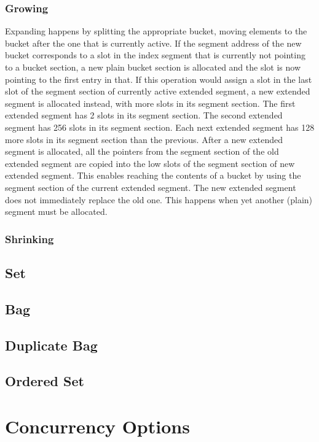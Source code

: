 \documentclass[aps,pre,preprint,nofootinbib]{revtex4}
\begin{document}
\subsubsection{Growing}

Expanding happens by splitting the appropriate bucket, moving elements to the bucket after the one that is currently active.
If the segment address of the new bucket corresponds to a slot in the index segment that is currently not pointing to a bucket section, a new plain bucket section is allocated and the slot is now pointing to the first entry in that.
If this operation would assign a slot in the last slot of the segment section of currently active extended segment, a new extended segment is allocated instead, with more slots in its segment section.
The first extended segment has 2 slots in its segment section.
The second extended segment has 256 slots in its segment section.
Each next extended segment has 128 more slots in its segment section than the previous.
After a new extended segment is allocated, all the pointers from the segment section of the old extended segment are copied into the low slots of the segment section of new extended segment.
This enables reaching the contents of a bucket by using the segment section of the current extended segment.
The new extended segment does not immediately replace the old one.
This happens when yet another (plain) segment must be allocated.

\subsubsection{Shrinking}



\subsection{Set}     %
\subsection{Bag}
\subsection{Duplicate Bag}


\subsection{Ordered Set}


\section{Concurrency Options} \label{sec:concurrency_options}
\end{document}

